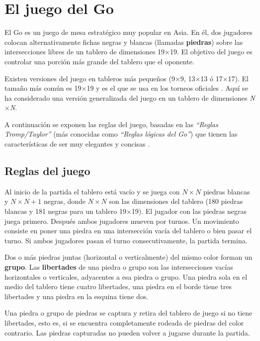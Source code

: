 \section{El juego del Go}
\label{sec:juego_go}
El Go es un juego de mesa estratégico muy popular en Asia.
En él, dos jugadores colocan alternativamente fichas negras y blancas (llamadas \textbf{piedras})  sobre las intersecciones libres de un tablero de dimensiones 19$\times$19.
El objetivo del juego es controlar una porción más grande del tablero que el oponente.

Existen versiones del juego en tableros más pequeños (9$\times$9, 13$\times$13 ó 17$\times$17).
El tamaño más común es 19$\times$19 y es el que se usa en los torneos oficiales .
Aquí se ha considerado una versión generalizada del juego en un tablero de dimensiones \textit{N$\times$N}.

\bigskip
A continuación se exponen las reglas del juego, basadas en las \textit{``Reglas Tromp/Taylor''} (más conocidas como \textit{``Reglas lógicas del Go''}) que tienen las características de ser muy elegantes y concisas .

\subsection{Reglas del juego}
\label{ssec:reglas_go}
Al inicio de la partida el tablero está vacío y se juega con $N \times N$ piedras blancas y $N \times N+1$ negras, donde $N \times N$ son las dimensiones del tablero (180 piedras blancas y 181 negras para un tablero 19$\times$19).
El jugador con las piedras negras juega primero. 
Después ambos jugadores mueven por turnos.
Un movimiento consiste en poner una piedra en una intersección vacía del tablero o bien pasar el turno. Si ambos jugadores pasan el turno consecutivamente, la partida termina.

Dos o más piedras juntas (horizontal o verticalmente) del mismo color forman un \textbf{grupo}.
Las \textbf{libertades} de una piedra o grupo son las intersecciones vacías horizontales o verticales, adyacentes a esa piedra o grupo. 
Una piedra sola en el medio del tablero tiene cuatro libertades, una piedra en el borde tiene tres libertades y una piedra en la esquina tiene dos.

Una piedra o grupo de piedras se captura y retira del tablero de juego si no tiene libertades, esto es, si se encuentra completamente rodeada de piedras del color contrario.
Las piedras capturadas no pueden volver a jugarse durante la partida.

